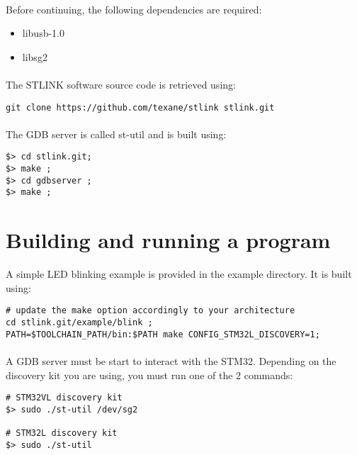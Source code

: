 \documentclass[a4paper, 11pt]{article}
\begin{document}
\paragraph{}
Before continuing, the following dependencies are required:
\begin{itemize}
\item libusb-1.0
\item libsg2
\end{itemize}

\paragraph{}
The STLINK software source code is retrieved using:\\
\begin{small}
\begin{lstlisting}[frame=tb]
git clone https://github.com/texane/stlink stlink.git
\end{lstlisting}
\end{small}

\paragraph{}
The GDB server is called st-util and is built using:\\
\begin{small}
\begin{lstlisting}[frame=tb]
$> cd stlink.git;
$> make ;
$> cd gdbserver ;
$> make ;
\end{lstlisting}
\end{small}


\newpage

\section{Building and running a program}
A simple LED blinking example is provided in the example directory. It is built using:\\
\begin{small}
\begin{lstlisting}[frame=tb]
# update the make option accordingly to your architecture
cd stlink.git/example/blink ;
PATH=$TOOLCHAIN_PATH/bin:$PATH make CONFIG_STM32L_DISCOVERY=1;
\end{lstlisting}
\end{small}

\paragraph{}
A GDB server must be start to interact with the STM32. Depending on the discovery kit you
are using, you must run one of the 2 commands:\\
\begin{small}
\begin{lstlisting}[frame=tb]
# STM32VL discovery kit
$> sudo ./st-util /dev/sg2

# STM32L discovery kit
$> sudo ./st-util
\end{lstlisting}
\end{small}
\end{document}
